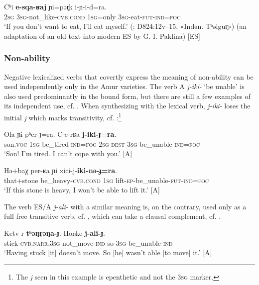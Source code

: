 \documentclass[output=paper,colorlinks,citecolor=brown]{langscibook}
\begin{document}
\ea\label{ex:niv:100}
    \gll Cʰi \textbf{e-sqa-ʁaj} ɲi=pər̥k i-ɲ{}-i-d=ra. \\ 
         \textsc{2sg} \textsc{3sg}{}-not\_like-\textsc{cvb.cond} 1\textsc{sg}=only \textsc{3sg}{}-eat-\textsc{fut-ind=foc} \\
    \glt ‘If you don’t want to eat, I’ll eat myself.’ (\cite{KreinovichMs}: D824:12v–15, «Indən. Tʰəlgur̥») (an adaptation of an old text into modern ES by G. I. Paklina) [ES]
\z 

\subsubsection{Non-ability}

Negative lexicalized verbs that covertly express the meaning of non-ability can be used independently only in the Amur varieties. The verb A \textit{j-iki-} ‘be unable’ is also used predominantly in the bound form, but there are still a few examples of its independent use, cf. . When synthesizing with the lexical verb, \textit{j-iki-} loses the initial \textit{j} which marks transitivity, cf. :\footnote{The \textit{j} seen in this example is epenthetic and not the 3\textsc{sg} marker.}


\ea\label{ex:niv:101}
    \gll Ola ɲi pʰer-ɟ=ra. Cʰe-rʁa \textbf{j-iki-ɟ=ra}. \\ 
         son.\textsc{voc} \textsc{1sg} be\_tired-\textsc{ind=foc} 2\textsc{sg-dest} \textsc{3sg}{}-be\_unable-\textsc{ind=foc} \\
    \glt ‘Son! I’m tired. I can’t cope with you.’ \citep[225]{Panfilov1965} [A]
\z 

\ea\label{ex:niv:102}
    \gll  Hə+baχ per-ʁa ɲi xici-j-\textbf{iki-nə{}-ɟ=ra}.\\ 
         that+stone be\_heavy-\textsc{cvb.cond} \textsc{1sg} lift-\textsc{ep}{}-be\_unable\textsc{{}-fut-ind=foc} \\
    \glt ‘If this stone is heavy, I won’t be able to lift it.’ \citep[162]{Panfilov1965} [A]
\z 

The verb ES/A \textit{j-ali-} with a similar meaning is, on the contrary, used only as a full free transitive verb, cf. , which can take a clausal complement, cf. .

\ea\label{ex:niv:103}
    \gll Ketv-r \textbf{tʰəŋr̥əŋa-ɟ}. Hoŋke \textbf{j-ali-ɟ}. \\ 
         stick-\textsc{cvb.narr.3sg} not\_move-\textsc{ind} so \textsc{3sg}{}-be\_unable-\textsc{ind} \\
    \glt ‘Having stuck [it] doesn’t move. So [he] wasn’t able [to move] it.’ \citep[226]{Panfilov1965} [A]
\z 
\end{document}
